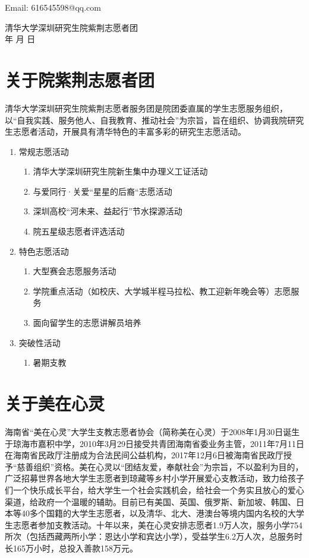 \documentclass[12pt]{ctexart}
\begin{document}
Email: 616545598@qq.com
\begin{flushright}
清华大学深圳研究生院紫荆志愿者团\\
\the\year 年 \the\month 月 \the\day 日
\end{flushright}
\begin{appendix}
\section{关于院紫荆志愿者团}
清华大学深圳研究生院紫荆志愿者服务团是院团委直属的学生志愿服务组织，以“自我实践、服务他人、自我教育、推动社会”为宗旨，旨在组织、协调我院研究生志愿者活动，开展具有清华特色的丰富多彩的研究生志愿活动。
\begin{enumerate}[label = {\chinese*、}]
\item 常规志愿活动
\begin{enumerate}[label =(\arabic*)]
         \item  清华大学深圳研究生院新生集中办理义工证活动
         \item 与爱同行·关爱“星星的后裔“志愿活动
         \item  深圳高校“河未来、益起行”节水探源活动
         \item 院五星级志愿者评选活动
\end{enumerate}
\item 特色志愿活动
\begin{enumerate}[label =(\arabic*)]
        \item 大型赛会志愿服务活动
        \item 学院重点活动（如校庆、大学城半程马拉松、教工迎新年晚会等）志愿服务
        \item 面向留学生的志愿讲解员培养
\end{enumerate}
\item 突破性活动
\begin{enumerate}[label =(\arabic*)]
         \item 暑期支教
\end{enumerate}
\end{enumerate}
\section{关于美在心灵}
海南省“美在心灵”大学生支教志愿者协会（简称美在心灵）于2008年1月30日诞生于琼海市嘉积中学，2010年3月29日接受共青团海南省委业务主管，2011年7月11日在海南省民政厅注册成为合法民间公益机构，2017年12月6日被海南省民政厅授予“慈善组织”资格。美在心灵以“团结友爱，奉献社会”为宗旨，不以盈利为目的，广泛招募世界各地大学生志愿者到琼藏等乡村小学开展爱心支教活动，致力给孩子们一个快乐成长平台，给大学生一个社会实践机会，给社会一个务实且放心的爱心渠道，给政府一个温暖的辅助。目前已有美国、英国、俄罗斯、新加坡、韩国、日本等40多个国籍的大学生志愿者，以及清华、北大、港澳台等境内国内名校的大学生志愿者参加支教活动。十年以来，美在心灵安排志愿者1.9万人次，服务小学754所次（包括西藏两所小学：恩达小学和宾达小学），受益学生6.2万人次，总服务时长165万小时，总投入善款158万元。

\end{appendix}
\end{document}
